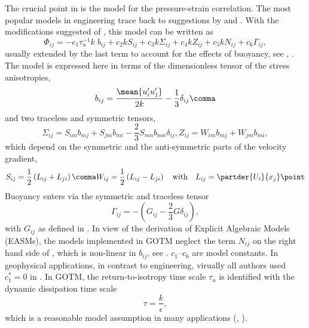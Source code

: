 The crucial point in  is the model for the
pressure-strain correlation. The most popular models in engineering
trace back to suggestions by \cite{Launderetal75} and
\cite{GibsonLaunder76}. With the modifications suggested of
\cite{Spezialeetal91}, this model can be written as
\begin{equation}
  \label{Phi}
    \Phi_{ij} = 
    - c_1 \tau^{-1}_u k \; b_{ij} 
    + c_2 k S_{ij} + c_3 k \Sigma_{ij} + c_4 k Z_{ij} 
    + c_5 k N_{ij} +  c_6 \Gamma_{ij}
   \comma
\end{equation}
usually extended by the last term to account for the effects of
buoyancy, see \cite{GibsonLaunder76}, \cite{GibsonLaunder78}. The
model  is expressed here in terms of the dimensionless tensor
of the stress anisotropies,
\begin{equation}
  \label{bij}
   b_{ij} = \dfrac{\mean{u'_i u'_j}}{2k} - \dfrac{1}{3} \delta_{ij}
  \comma
\end{equation}
and two traceless and symmetric tensors,
\begin{equation}
  \label{SigmaZ}
  \Sigma_{ij} = S_{im} b_{mj} + S_{jm} b_{mi} - \frac{2}{3} S_{mn} b_{mn} \delta_{ij} \comma
       Z_{ij} = W_{im} b_{mj} + W_{jm} b_{mi}
   \comma
\end{equation}
which depend on the symmetric and the anti-symmetric parts of the velocity gradient,
\begin{equation}
  \label{SandW}
  S_{ij} = \frac{1}{2} \left( L_{ij} + L_{ji} \right) \comma
  W_{ij} = \frac{1}{2} \left( L_{ij} - L_{ji} \right) 
  \quad \text{with} \quad
  L_{ij} =  \partder{U_i}{x_j}
  \point
\end{equation}
Buoyancy enters via the symmetric and traceless tensor
\begin{equation}
  \label{Gammaij}
  \Gamma_{ij} = - \left( G_{ij} - \frac{2}{3} G \delta_{ij} \right) 
  \comma
\end{equation}
with $G_{ij}$ as defined in . In view of the derivation
of Explicit Algebraic Models (EASMs), the models implemented in GOTM
neglect the term $N_{ij}$ on the right hand side of , which is
non-linear in $b_{ij}$, see \cite{Spezialeetal91}. $c_1$--$c_6$ are
model constants. In geophysical applications, in contrast to
engineering, virually all authors used $c^*_1=0$ in . In GOTM,
the return-to-isotropy time scale $\tau_u$ is identified with the 
dynamic dissipation time scale
\begin{equation}
  \label{DefTau}
   \tau = \dfrac{k}{\epsilon}
   \comma
\end{equation}
which is a reasonable model assumption in many applications
(\cite{Canutoetal2001a}, \cite{Jinetal2003}).


